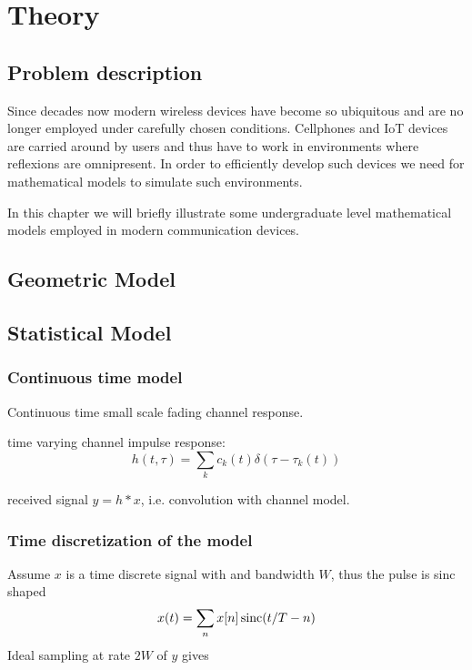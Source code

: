 
\chapter{Theory}

\section{Problem description}

Since decades now modern wireless devices have become so ubiquitous and are no longer employed under carefully chosen conditions. Cellphones and IoT devices are carried around by users and thus have to work in environments where reflexions are omnipresent. In order to efficiently develop such devices we need for mathematical models to simulate such environments.

In this chapter we will briefly illustrate some undergraduate level mathematical models employed in modern communication devices.

\section{Geometric Model}

\section{Statistical Model}


\subsection{Continuous time model}

Continuous time small scale fading channel response.

time varying channel impulse response:
\begin{equation}
	h(t, \tau) = \sum_k c_k (t) \delta(\tau - \tau_k(t))
\end{equation}

received signal \(y = h * x\), i.e. convolution with channel model.

\subsection{Time discretization of the model}


Assume \(x\) is a time discrete signal with and bandwidth \(W\), thus the pulse is sinc shaped
\begin{equation}
	x(t) = \sum_n x[n] \operatorname{sinc}(t/T - n)
\end{equation}
Ideal sampling at rate \(2W\) of \(y\) gives
